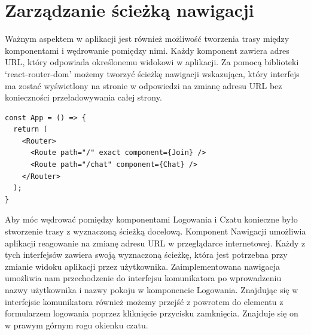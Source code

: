 \section{Zarządzanie ścieżką nawigacji}
Ważnym aspektem w aplikacji jest również możliwość tworzenia trasy między komponentami i wędrowanie pomiędzy nimi. Każdy komponent zawiera adres URL, który odpowiada określonemu widokowi w aplikacji. Za pomocą biblioteki ‘react-router-dom’ możemy tworzyć ścieżkę nawigacji wskazująca, który interfejs ma zostać wyświetlony na stronie w odpowiedzi na zmianę adresu URL bez konieczności przeładowywania całej strony.
\begin{lstlisting}[caption=Implementacja ścieżki nawigacji pomiędzy interfejsam]
const App = () => {
  return (
    <Router>
      <Route path="/" exact component={Join} />
      <Route path="/chat" component={Chat} />
    </Router>
  );
}
\end{lstlisting}
Aby móc wędrować pomiędzy komponentami Logowania i Czatu konieczne było stworzenie trasy z wyznaczoną ścieżką docelową. Komponent Nawigacji umożliwia aplikacji reagowanie na zmianę adresu URL w przeglądarce internetowej. Każdy z tych interfejsów zawiera swoją wyznaczoną ścieżkę, która jest potrzebna przy zmianie widoku aplikacji przez użytkownika. Zaimplementowana nawigacja umożliwia nam przechodzenie do interfejsu komunikatora po wprowadzeniu nazwy użytkownika i nazwy pokoju w komponencie Logowania. Znajdując się w interfejsie komunikatora również możemy przejść z powrotem do elementu z formularzem logowania poprzez kliknięcie przycisku zamknięcia. Znajduje się on w prawym górnym rogu okienku czatu.
